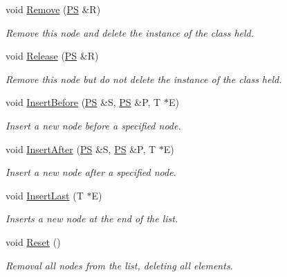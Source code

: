 \begin{DoxyCompactItemize}
void \hyperlink{classlink_list_a037a6302399829af84930668eedd6f71}{Remove} (\hyperlink{structlink_list_1_1_snode}{PS} \&R)
\begin{DoxyCompactList}\small\item\em Remove this node and delete the instance of the class held. \item\end{DoxyCompactList}\item 
void \hyperlink{classlink_list_a24a989f008cb02dd4e452f4e5479d5cb}{Release} (\hyperlink{structlink_list_1_1_snode}{PS} \&R)
\begin{DoxyCompactList}\small\item\em Remove this node but do not delete the instance of the class held. \item\end{DoxyCompactList}\item 
void \hyperlink{classlink_list_a1084a4290ce03f2d192ba834a9bfb624}{InsertBefore} (\hyperlink{structlink_list_1_1_snode}{PS} \&S, \hyperlink{structlink_list_1_1_snode}{PS} \&P, T $\ast$E)
\begin{DoxyCompactList}\small\item\em Insert a new node before a specified node. \item\end{DoxyCompactList}\item 
void \hyperlink{classlink_list_a098f769c818a9a5f5b9946861bd7199e}{InsertAfter} (\hyperlink{structlink_list_1_1_snode}{PS} \&S, \hyperlink{structlink_list_1_1_snode}{PS} \&P, T $\ast$E)
\begin{DoxyCompactList}\small\item\em Insert a new node after a specified node. \item\end{DoxyCompactList}\item 
void \hyperlink{classlink_list_a5ef6013a096b9065c2c362fcd5113413}{InsertLast} (T $\ast$E)
\begin{DoxyCompactList}\small\item\em Inserts a new node at the end of the list. \item\end{DoxyCompactList}\item 
void \hyperlink{classlink_list_a4cfd6a668f25493621d5c2e9db192359}{Reset} ()
\begin{DoxyCompactList}\small\item\em Removal all nodes from the list, deleting all elements. \item\end{DoxyCompactList}\item 

\end{DoxyCompactItemize}
